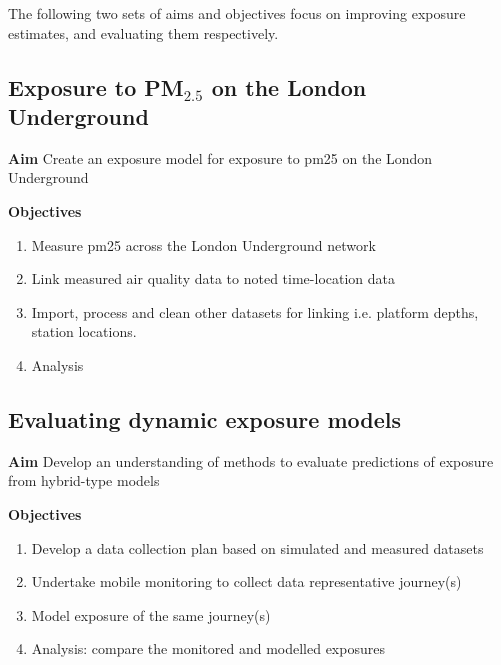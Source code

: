 The following two sets of aims and objectives focus on improving exposure estimates, and evaluating them respectively.

\subsection{Exposure to \texorpdfstring{PM$_{2.5}$}{} on the London Underground}
\label{sec:exposure_on_the_tube}

\textbf{Aim} Create an exposure model for exposure to \gls{pm25} on the London Underground

\textbf{Objectives}

\begin{enumerate}
\item Measure \gls{pm25} across the London Underground network
\item Link measured air quality data to noted time-location data
\item Import, process and clean other datasets for linking i.e. platform depths, station locations. 
\item Analysis
\end{enumerate}

\subsection{Evaluating dynamic exposure models}
\label{sec:evaluating}

\textbf{Aim} Develop an understanding of methods to evaluate predictions of exposure from hybrid-type models

\textbf{Objectives}

\begin{enumerate}
    \item Develop a data collection plan based on simulated and measured datasets
    \item Undertake mobile monitoring to collect data representative journey(s)
    \item Model exposure of the same journey(s)
    \item Analysis: compare the monitored and modelled exposures
\end{enumerate}